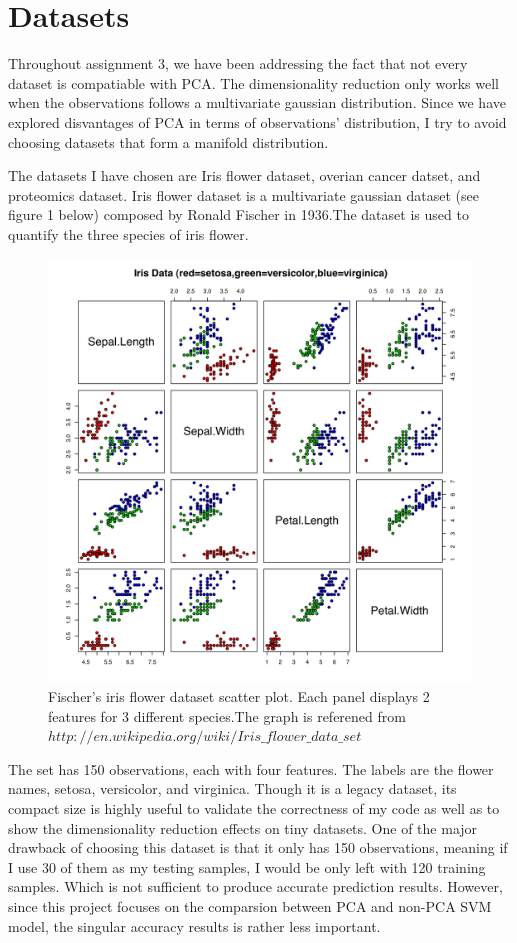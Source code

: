 \documentclass[11pt]{article}
\begin{document}
\section{Datasets}
 Throughout assignment 3, we have been addressing the fact that not every dataset is compatiable with PCA. The dimensionality reduction only works well when the observations follows a multivariate gaussian distribution. Since we have explored disvantages of PCA in terms of observations' distribution, I try to avoid choosing datasets that form a manifold distribution.\par 
The datasets I have chosen are Iris flower dataset, overian cancer datset, and proteomics dataset. Iris flower dataset is a multivariate gaussian dataset (see figure 1 below) composed by Ronald Fischer in 1936.The dataset is used to quantify the three species of iris flower. 

\begin{figure}[H]
\centering
\includegraphics[width=120mm]{iris.jpg}
\caption{ Fischer's iris flower dataset scatter plot. Each panel displays 2 features for 3 different species.The graph is referened from $http://en.wikipedia.org/wiki/Iris\_flower\_data\_set$ \label{problem1Pic2}}
\end{figure}

The set has 150 observations, each with four features. The labels are the flower names, setosa, versicolor, and virginica. Though it is a legacy dataset, its compact size is highly useful to validate the correctness of my code as well as to show the dimensionality reduction effects on tiny datasets. One of the major drawback of choosing this dataset is that it only has 150 observations, meaning if I use 30 of them as my testing samples, I would be only left with 120 training samples. Which is not sufficient to produce 
accurate prediction results. However, since this project focuses on the comparsion between PCA and non-PCA SVM model, the singular accuracy results is rather less important. \par
\end{document}
